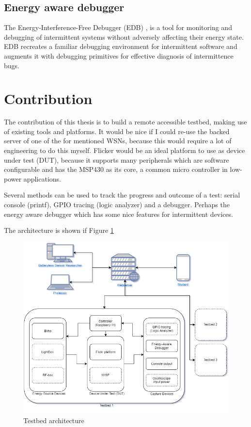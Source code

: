 \subsection{Energy aware debugger}
The Energy-Interference-Free Debugger (EDB) \cite{edb}, is a tool for monitoring and debugging of intermittent systems without adversely affecting their energy state. EDB recreates a familiar debugging environment for intermittent software and augments it with debugging primitives for effective diagnosis of intermittence bugs.

\section{Contribution}
The contribution of this thesis is to build a remote accessible testbed, making use of existing tools and platforms. It would be nice if I could re-use the backed server of one of the for mentioned WSNs, because this would require a lot of engineering to do this myself. Flicker would be an ideal platform to use as device under test (DUT), because it supports many peripherals which are software configurable and has the MSP430 as its core, a common micro controller in low-power applications.

Several methods can be used to track the progress and outcome of a test: serial console (printf), GPIO tracing (logic analyzer) and a debugger. Perhaps the energy aware debugger which has some nice features for intermittent devices.

The architecture is shown if Figure \ref{fig:architecture}

\begin{figure}[htb]
\includegraphics[width=\textwidth]{pics/testbed-architecture-v2}
\caption{Testbed architecture}
\label{fig:architecture}
\end{figure}

